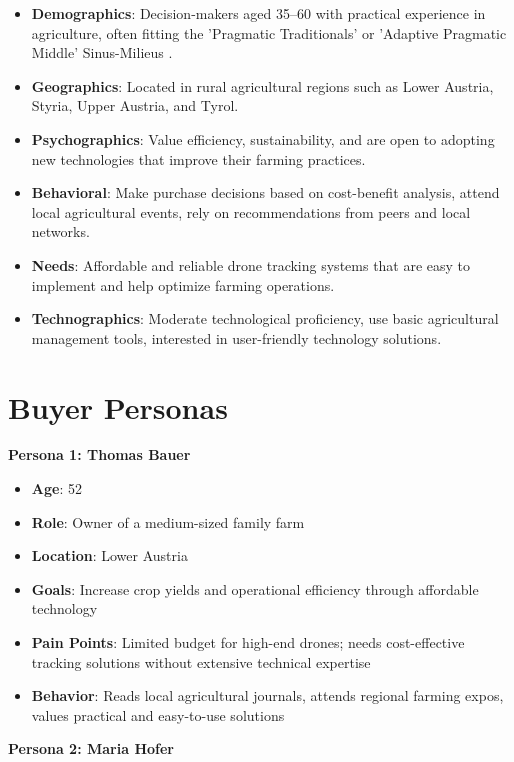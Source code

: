 \begin{itemize} %
	\item \textbf{Demographics}: Decision-makers aged 35--60 with practical experience in agriculture, often fitting the 'Pragmatic Traditionals' or 'Adaptive Pragmatic Middle' Sinus-Milieus \cite{sinus_institut_2024}. 
	\item \textbf{Geographics}: Located in rural agricultural regions such as Lower Austria, Styria, Upper Austria, and Tyrol. 
	\item \textbf{Psychographics}: Value efficiency, sustainability, and are open to adopting new technologies that improve their farming practices. 
	\item \textbf{Behavioral}: Make purchase decisions based on cost-benefit analysis, attend local agricultural events, rely on recommendations from peers and local networks. 
	\item \textbf{Needs}: Affordable and reliable drone tracking systems that are easy to implement and help optimize farming operations. 
	\item \textbf{Technographics}: Moderate technological proficiency, use basic agricultural management tools, interested in user-friendly technology solutions. 
\end{itemize}

\section{Buyer Personas}

\textbf{Persona 1: Thomas Bauer}

\begin{itemize}
	\item \textbf{Age}: 52 
	\item \textbf{Role}: Owner of a medium-sized family farm 
	\item \textbf{Location}: Lower Austria
	\item \textbf{Goals}: Increase crop yields and operational efficiency through affordable technology 
	\item \textbf{Pain Points}: Limited budget for high-end drones; needs cost-effective tracking solutions without extensive technical expertise 
	\item \textbf{Behavior}: Reads local agricultural journals, attends regional farming expos, values practical and easy-to-use solutions 
\end{itemize}

\textbf{Persona 2: Maria Hofer}

